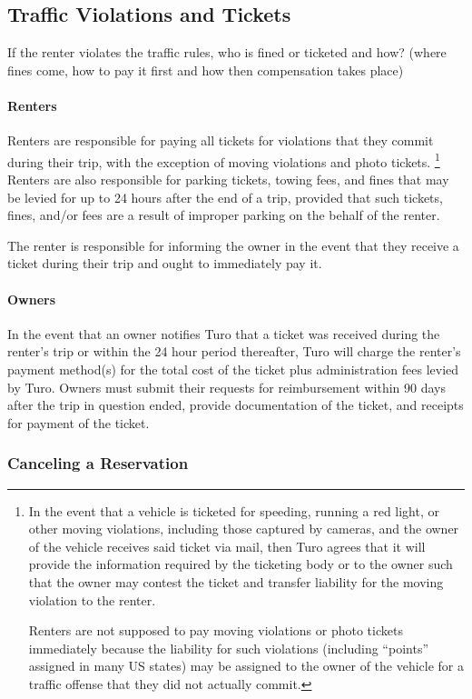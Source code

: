 \documentclass[review,12pt]{elsarticle}
\begin{document}
  \subsection{Traffic Violations and Tickets}
  If the renter violates the traffic rules, who is fined or ticketed and how? (where fines come, how to pay it first and how then compensation takes place)
    \paragraph{Renters}
    Renters are responsible for paying all tickets for violations that they commit during their trip, with the exception of moving violations and photo tickets.
      \footnote{In the event that a vehicle is ticketed for speeding, running a red light, or other moving violations, including those captured by cameras, and the owner of the vehicle receives said ticket via mail, then Turo agrees that it will provide the information required by the ticketing body or to the owner such that the owner may contest the ticket and transfer liability for the moving violation to the renter.

      Renters are not supposed to pay moving violations or photo tickets immediately because the liability for such violations (including ``points'' assigned in many US states) may be assigned to the owner of the vehicle for a traffic offense that they did not actually commit.
      }
    Renters are also responsible for parking tickets, towing fees, and fines that may be levied for up to 24 hours after the end of a trip, provided that such tickets, fines, and/or fees are a result of improper parking on the behalf of the renter.

    The renter is responsible for informing the owner in the event that they receive a ticket during their trip and ought to immediately pay it.

    \paragraph{Owners}
    In the event that an owner notifies Turo that a ticket was received during the renter's trip or within the 24 hour period thereafter, Turo will charge the renter's payment method(s) for the total cost of the ticket plus administration fees levied by Turo. Owners must submit their requests for reimbursement within 90 days after the trip in question ended, provide documentation of the ticket, and receipts for payment of the ticket.

  \subsubsection{Canceling a Reservation}
\end{document}
